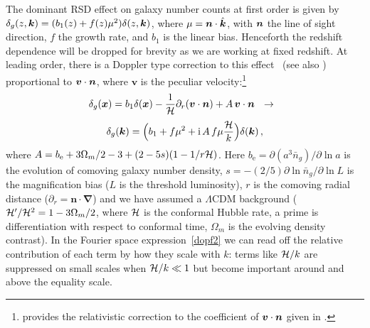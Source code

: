 The dominant RSD effect on galaxy number counts at first order is given by $\delta_g(z,\bm {k}) = (b_{1}(z) + f (z) \mu^{2})\delta(z,\bm {k})$, where $\mu=\bm {n}\cdot\hat{\bm {k}}$, with $\bm {n}$ the line of sight direction, $f$ the growth rate, and $b_1$ is the linear bias. Henceforth the redshift dependence will be dropped for brevity as we are working at fixed redshift. At leading order, there is a Doppler type correction to this effect~\citep{Kaiser:1987qv,McDonald:2009dh,Challinor:2011bk} (see also \citet{Raccanelli:2016avd,Hall:2016bmm,Abramo:2017xnp})
proportional to $\bm{v}\cdot\bm {n}$, where $\bm{v}$ is the peculiar velocity:\footnote{\citet{Challinor:2011bk} provides the relativistic correction to the coefficient of  $\bm{v}\cdot\bm {n}$ given in \citet{Kaiser:1987qv,McDonald:2009dh}.}
\begin{equation} \label{dopf}
\delta_g(\bm {x}) = b_{1} \delta(\bm {x})-{\frac{1}{\mathcal{H}}}\partial_r(\bm{v}\cdot\bm {n}) +{A}\,\bm{v}\cdot\bm {n} ~~\to~~
\end{equation}
\begin{equation} \delta_g(\bm {k})=\Big(b_1+f\mu^2+\mathrm{i\,} {A}\,f \mu{\frac{\mathcal{H}}{k}}\Big)\delta(\bm {k})\,,\label{dopf2}
\end{equation}
where  ${A} = {b_{\textrm{e}}+{3}\Omega_m/2 -3 + (2-5s) (1-{1/ r\mathcal{H}} )}$.
Here  $b_{\textrm{e}}=\partial (a^3 \bar{n}_g)/\partial \ln a$ is the evolution of comoving galaxy number density, $s=-(2/5)\partial \ln \bar{n}_g/\partial \ln L$ is the magnification bias ($L$ is the threshold luminosity), $r$ is the comoving radial distance ($\partial_r=\bm n\cdot\bm\nabla$) and we have assumed a $\Lambda$CDM background
($\mathcal{H}'/\mathcal{H}^2=1-3\Omega_m/2$, where $\mathcal{H}$ is the conformal Hubble rate, a prime is differentiation with respect to conformal time, $\Omega_m$ is the evolving density contrast). In the  Fourier space expression~\eqref{dopf2} we can read off the relative contribution of each term by how they scale with $k$: terms like $\mathcal{H}/k$ are suppressed on small scales when $\mathcal{H}/k\ll1$ but become important around and above the equality scale. 


